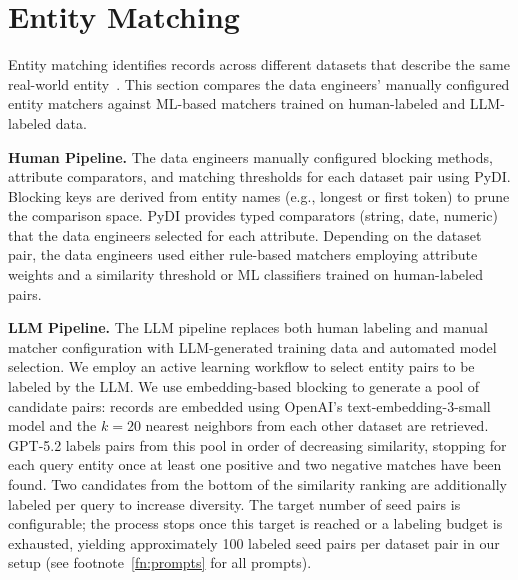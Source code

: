 \section{Entity Matching}
\label{sec:entity_matching}
Entity matching identifies records across different datasets that describe the same real-world entity~\cite{christen2012data, peeters2024entity}. This section compares the data engineers' manually configured entity matchers against ML-based matchers trained on human-labeled and LLM-labeled data.

\textbf{Human Pipeline.}\label{sec:em_human} The data engineers manually configured blocking methods, attribute comparators, and matching thresholds for each dataset pair using PyDI. Blocking keys are derived from entity names (e.g., longest or first token) to prune the comparison space. PyDI provides typed comparators (string, date, numeric) that the data engineers selected for each attribute. Depending on the dataset pair, the data engineers used either rule-based matchers employing attribute weights and a similarity threshold or ML classifiers trained on human-labeled pairs.

\textbf{LLM Pipeline.}
\label{sec:em_approach}
The LLM pipeline replaces both human labeling and manual matcher configuration with LLM-generated training data and automated model selection. We employ an active learning workflow to select entity pairs to be labeled by the LLM. We use embedding-based blocking to generate a pool of candidate pairs: records are embedded using OpenAI's text-embedding-3-small model and the $k{=}20$ nearest neighbors from each other dataset are retrieved. GPT-5.2 labels pairs from this pool in order of decreasing similarity, stopping for each query entity once at least one positive and two negative matches have been found. Two candidates from the bottom of the similarity ranking are additionally labeled per query to increase diversity. The target number of seed pairs is configurable; the process stops once this target is reached or a labeling budget is exhausted, yielding approximately 100 labeled seed pairs per dataset pair in our setup (see footnote~\ref{fn:prompts} for all prompts).

